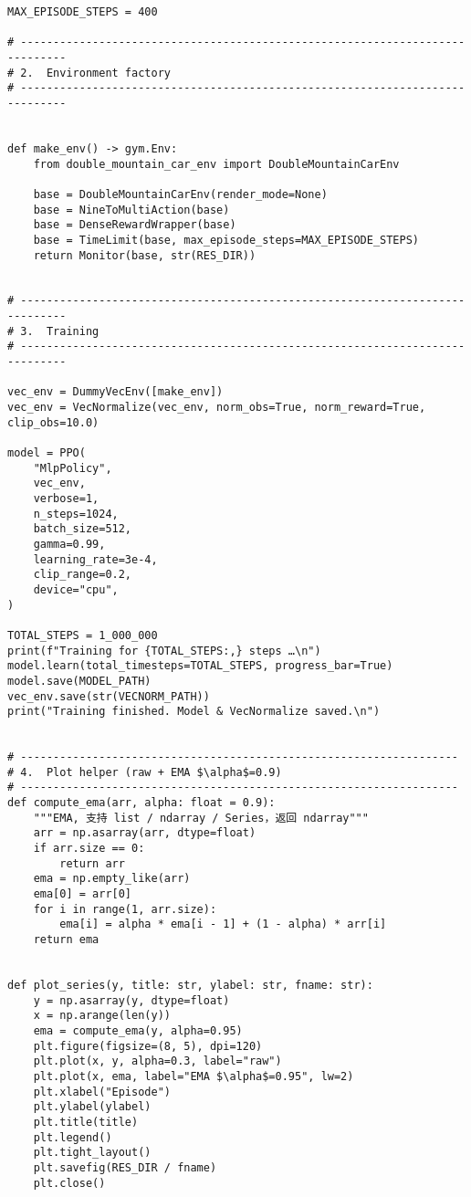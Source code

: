 \begin{verbatim}
MAX_EPISODE_STEPS = 400

# -----------------------------------------------------------------------------
# 2.  Environment factory
# -----------------------------------------------------------------------------


def make_env() -> gym.Env:
    from double_mountain_car_env import DoubleMountainCarEnv

    base = DoubleMountainCarEnv(render_mode=None)
    base = NineToMultiAction(base)
    base = DenseRewardWrapper(base)
    base = TimeLimit(base, max_episode_steps=MAX_EPISODE_STEPS)
    return Monitor(base, str(RES_DIR))


# -----------------------------------------------------------------------------
# 3.  Training
# -----------------------------------------------------------------------------

vec_env = DummyVecEnv([make_env])
vec_env = VecNormalize(vec_env, norm_obs=True, norm_reward=True, clip_obs=10.0)

model = PPO(
    "MlpPolicy",
    vec_env,
    verbose=1,
    n_steps=1024,
    batch_size=512,
    gamma=0.99,
    learning_rate=3e-4,
    clip_range=0.2,
    device="cpu",
)

TOTAL_STEPS = 1_000_000
print(f"Training for {TOTAL_STEPS:,} steps …\n")
model.learn(total_timesteps=TOTAL_STEPS, progress_bar=True)
model.save(MODEL_PATH)
vec_env.save(str(VECNORM_PATH))
print("Training finished. Model & VecNormalize saved.\n")


# -------------------------------------------------------------------
# 4.  Plot helper (raw + EMA $\alpha$=0.9)
# -------------------------------------------------------------------
def compute_ema(arr, alpha: float = 0.9):
    """EMA, 支持 list / ndarray / Series，返回 ndarray"""
    arr = np.asarray(arr, dtype=float)
    if arr.size == 0:
        return arr
    ema = np.empty_like(arr)
    ema[0] = arr[0]
    for i in range(1, arr.size):
        ema[i] = alpha * ema[i - 1] + (1 - alpha) * arr[i]
    return ema


def plot_series(y, title: str, ylabel: str, fname: str):
    y = np.asarray(y, dtype=float)
    x = np.arange(len(y))
    ema = compute_ema(y, alpha=0.95)
    plt.figure(figsize=(8, 5), dpi=120)
    plt.plot(x, y, alpha=0.3, label="raw")
    plt.plot(x, ema, label="EMA $\alpha$=0.95", lw=2)
    plt.xlabel("Episode")
    plt.ylabel(ylabel)
    plt.title(title)
    plt.legend()
    plt.tight_layout()
    plt.savefig(RES_DIR / fname)
    plt.close()



\end{verbatim}
